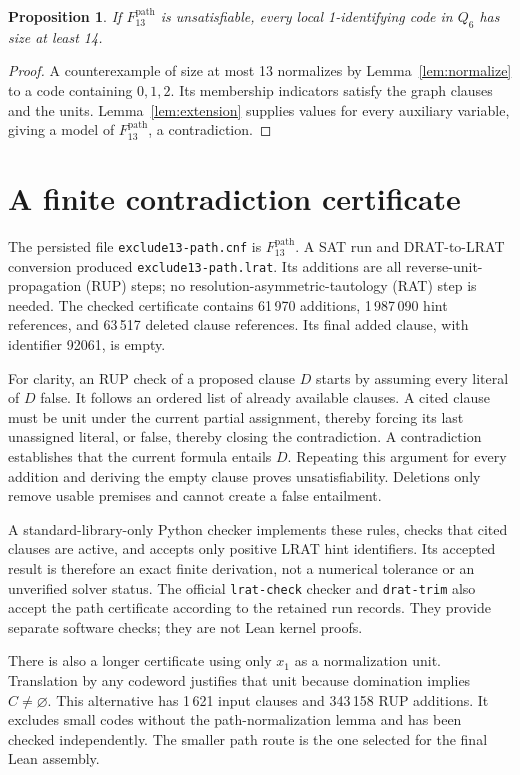\documentclass[11pt]{article}
\newtheorem{proposition}[theorem]{Proposition}
\begin{document}
\begin{proposition}\label{prop:reduction}
If $F_{13}^{\mathrm{path}}$ is unsatisfiable, every local 1-identifying code in $Q_6$ has size at least 14.
\end{proposition}
\begin{proof}
A counterexample of size at most 13 normalizes by Lemma~\ref{lem:normalize} to a code containing $0,1,2$. Its membership indicators satisfy the graph clauses and the units. Lemma~\ref{lem:extension} supplies values for every auxiliary variable, giving a model of $F_{13}^{\mathrm{path}}$, a contradiction.
\end{proof}

\section{A finite contradiction certificate}\label{sec:certificate}
The persisted file \texttt{exclude13-path.cnf} is $F_{13}^{\mathrm{path}}$. A SAT run and DRAT-to-LRAT conversion produced \texttt{exclude13-path.lrat}. Its additions are all reverse-unit-propagation (RUP) steps; no resolution-asymmetric-tautology (RAT) step is needed. The checked certificate contains 61\,970 additions, 1\,987\,090 hint references, and 63\,517 deleted clause references. Its final added clause, with identifier 92061, is empty.

For clarity, an RUP check of a proposed clause $D$ starts by assuming every literal of $D$ false. It follows an ordered list of already available clauses. A cited clause must be unit under the current partial assignment, thereby forcing its last unassigned literal, or false, thereby closing the contradiction. A contradiction establishes that the current formula entails $D$. Repeating this argument for every addition and deriving the empty clause proves unsatisfiability. Deletions only remove usable premises and cannot create a false entailment.

A standard-library-only Python checker implements these rules, checks that cited clauses are active, and accepts only positive LRAT hint identifiers. Its accepted result is therefore an exact finite derivation, not a numerical tolerance or an unverified solver status. The official \texttt{lrat-check} checker and \texttt{drat-trim} also accept the path certificate according to the retained run records. They provide separate software checks; they are not Lean kernel proofs.

There is also a longer certificate using only $x_1$ as a normalization unit. Translation by any codeword justifies that unit because domination implies $C\ne\varnothing$. This alternative has 1\,621 input clauses and 343\,158 RUP additions. It excludes small codes without the path-normalization lemma and has been checked independently. The smaller path route is the one selected for the final Lean assembly.
\end{document}
